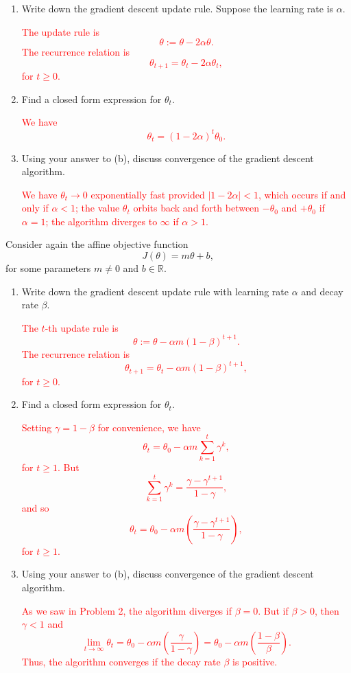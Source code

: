 \documentclass[12pt,reqno]{amsart}
\begin{document}
\begin{enumerate}
\item Write down the gradient descent update rule. Suppose the learning rate is $\alpha$.

\bigskip
\textcolor{red}{The update rule is
	\[\theta := \theta - 2\alpha \theta.
	\]
The recurrence relation is
	\[\theta_{t+1} = \theta_{t} - 2\alpha\theta_{t},
	\]
for $t\geq 0$.}
\bigskip

\item Find a closed form expression for $\theta_t$.

\bigskip
\textcolor{red}{We have
	\[\theta_t = (1-2\alpha)^t \theta_0.
	\]}
\bigskip

\item Using your answer to (b), discuss convergence of the gradient descent algorithm.

\bigskip
\textcolor{red}{We have $\theta_t \to 0$ exponentially fast provided $|1-2\alpha|<1$, which occurs if and only if $\alpha < 1$; the value $\theta_t$ orbits back and forth between $-\theta_0$ and $+\theta_0$ if $\alpha =1$; the algorithm diverges to $\infty$ if $\alpha>1$.}
\bigskip
\end{enumerate}










\prob Consider again the affine objective function
	\[J(\theta) = m\theta + b,
	\]
for some parameters $m\neq 0$ and $b\in \mathbb{R}$.

\medskip
\begin{enumerate}
\item Write down the gradient descent update rule with learning rate $\alpha$ and decay rate $\beta$.

\bigskip
\textcolor{red}{The $t$-th update rule is
	\[\theta := \theta - \alpha m(1-\beta)^{t+1}.
	\]
The recurrence relation is
	\[\theta_{t+1} = \theta_{t} - \alpha m(1-\beta)^{t+1},
	\]
for $t\geq 0$.}
\bigskip

\item Find a closed form expression for $\theta_t$.

\bigskip
\textcolor{red}{Setting $\gamma = 1-\beta$ for convenience, we have
	\[\theta_t = \theta_0 - \alpha m \sum_{k=1}^t \gamma^k,
	\]
for $t\geq 1$. But
	\[\sum_{k=1}^t \gamma^k = \frac{\gamma - \gamma^{t+1}}{1-\gamma},
	\]
and so
	\[\theta_t = \theta_0 - \alpha m \left( \frac{\gamma - \gamma^{t+1}}{1-\gamma}\right),
	\]
for $t\geq 1$.}
\bigskip

\item Using your answer to (b), discuss convergence of the gradient descent algorithm.

\bigskip
\textcolor{red}{As we saw in Problem 2, the algorithm diverges if $\beta=0$. But if $\beta>0$, then $\gamma <1$ and
	\[\lim_{t\to \infty} \theta_t = \theta_0 - \alpha m \left( \frac{\gamma}{1-\gamma} \right) = \theta_0 - \alpha m \left( \frac{1-\beta}{\beta} \right).
	\]
Thus, the algorithm converges if the decay rate $\beta$ is positive.}
\bigskip
\end{enumerate}
\end{document}
